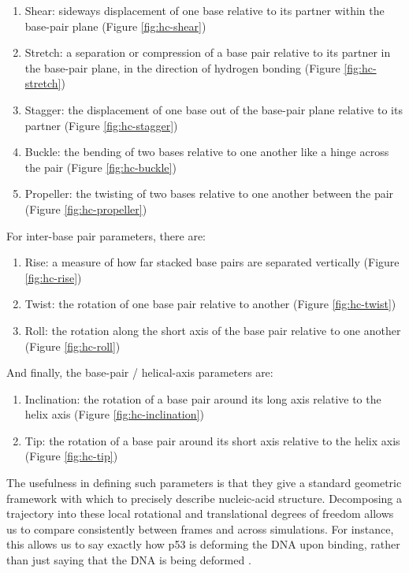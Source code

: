 \begin{enumerate}
\item Shear: sideways displacement of one base relative to its partner within the base-pair plane (Figure \ref{fig:hc-shear})
\item Stretch: a separation or compression of a base pair relative to its partner in the base-pair plane, in the direction of hydrogen bonding (Figure \ref{fig:hc-stretch})
\item Stagger: the displacement of one base out of the base-pair plane relative to its partner (Figure \ref{fig:hc-stagger})
\item Buckle: the bending of two bases relative to one another like a hinge across the pair (Figure \ref{fig:hc-buckle})
\item Propeller: the twisting of two bases relative to one another between the pair (Figure \ref{fig:hc-propeller})
\end{enumerate}

For inter-base pair parameters, there are:

\begin{enumerate}
\item Rise: a measure of how far stacked base pairs are separated vertically (Figure \ref{fig:hc-rise})
\item Twist: the rotation of one base pair relative to another (Figure \ref{fig:hc-twist})
\item Roll: the rotation along the short axis of the base pair relative to one another (Figure \ref{fig:hc-roll})
\end{enumerate}

And finally, the base-pair / helical-axis parameters are:

\begin{enumerate}
\item Inclination: the rotation of a base pair around its long axis relative to the helix axis (Figure \ref{fig:hc-inclination})
\item Tip: the rotation of a base pair around its short axis relative to the helix axis (Figure \ref{fig:hc-tip})
\end{enumerate}

The usefulness in defining such parameters is that they give a standard geometric framework with which to precisely describe nucleic-acid structure. Decomposing a trajectory into these local rotational and translational degrees of freedom allows us to compare consistently between frames and across simulations. For instance, this allows us to say exactly how p53 is deforming the DNA upon binding, rather than just saying that the DNA is being deformed \parencite{lu3DNASoftwarePackage2003, lu3DNAVersatileIntegrated2008, passowContrastingPatternsRapid2019}.

